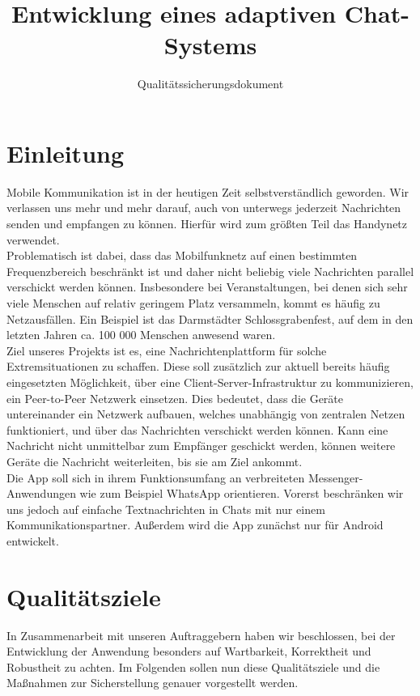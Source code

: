 \documentclass[accentcolor=tud0b,12pt,paper=a4]{tudreport}
\title{Entwicklung eines adaptiven Chat-Systems}
\subtitle{Qualitätssicherungsdokument}
\begin{document}
  \maketitle
  \tableofcontents

  \chapter{Einleitung}
    Mobile Kommunikation ist in der heutigen Zeit selbstverständlich geworden. Wir verlassen uns mehr und mehr darauf, auch von unterwegs jederzeit Nachrichten senden und empfangen zu können. Hierfür wird zum größten Teil das Handynetz verwendet.\\

    Problematisch ist dabei, dass das Mobilfunknetz auf einen bestimmten Frequenzbereich beschränkt ist und daher nicht beliebig viele Nachrichten parallel verschickt werden können. Insbesondere bei Veranstaltungen, bei denen sich sehr viele Menschen auf relativ geringem Platz versammeln, kommt es häufig zu Netzausfällen. Ein Beispiel ist das Darmstädter Schlossgrabenfest, auf dem in den letzten Jahren ca. 100 000 Menschen anwesend waren.\\

    Ziel unseres Projekts ist es, eine Nachrichtenplattform für solche Extremsituationen zu schaffen. Diese soll zusätzlich zur aktuell bereits häufig eingesetzten Möglichkeit, über eine Client-Server-Infrastruktur zu kommunizieren, ein Peer-to-Peer Netzwerk einsetzen. Dies bedeutet, dass die Geräte untereinander ein Netzwerk aufbauen, welches unabhängig von zentralen Netzen funktioniert, und über das Nachrichten verschickt werden können. Kann eine Nachricht nicht unmittelbar zum Empfänger geschickt werden, können weitere Geräte die Nachricht weiterleiten, bis sie am Ziel ankommt.\\

    Die App soll sich in ihrem Funktionsumfang an verbreiteten Messenger-Anwendungen wie zum Beispiel WhatsApp orientieren. Vorerst beschränken wir uns jedoch auf einfache Textnachrichten in Chats mit nur einem Kommunikationspartner. Außerdem wird die App zunächst nur für Android entwickelt.

  \chapter{Qualitätsziele}
    In Zusammenarbeit mit unseren Auftraggebern haben wir beschlossen, bei der Entwicklung der Anwendung besonders auf Wartbarkeit, Korrektheit und Robustheit zu achten. Im Folgenden sollen nun diese Qualitätsziele und die Maßnahmen zur Sicherstellung genauer vorgestellt werden.
\end{document}
